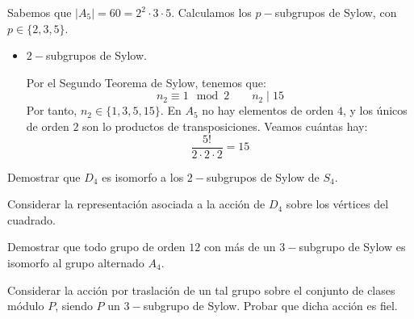 \begin{ejercicio}
\begin{enumerate}
        Sabemos que $|A_5|=60=2^2\cdot 3\cdot 5$. Calculamos los $p-$subgrupos de Sylow, con $p\in \{2,3,5\}$.
        \begin{itemize}
            \item $2-$subgrupos de Sylow.
            
            Por el Segundo Teorema de Sylow, tenemos que:
            \begin{equation*}
                n_2 \equiv 1 \mod 2 \qquad n_2 \mid 15
            \end{equation*}
            Por tanto, $n_2\in \{1,3,5,15\}$.
            En $A_5$ no hay elementos de orden $4$, y los únicos de orden $2$ son lo productos de transposiciones. Veamos cuántas hay:
            \begin{equation*}
                \dfrac{5!}{2\cdot 2\cdot 2} = 15
            \end{equation*}


        \end{itemize}
    \end{enumerate}
\end{ejercicio}

\begin{ejercicio}\label{ej:6.22}
    Demostrar que $D_4$ es isomorfo a los $2-$subgrupos de Sylow de $S_4$.
    \begin{observacion}
        Considerar la representación asociada a la acción de $D_4$ sobre los vértices del cuadrado.
    \end{observacion}
\end{ejercicio}

\begin{ejercicio}\label{ej:6.23}
    Demostrar que todo grupo de orden $12$ con más de un $3-$subgrupo de Sylow es isomorfo al grupo alternado $A_4$.
    \begin{observacion}
        Considerar la acción por traslación de un tal grupo sobre el conjunto de clases módulo $P$, siendo $P$ un $3-$subgrupo de Sylow. Probar que dicha acción es fiel.
    \end{observacion}

\end{ejercicio}

